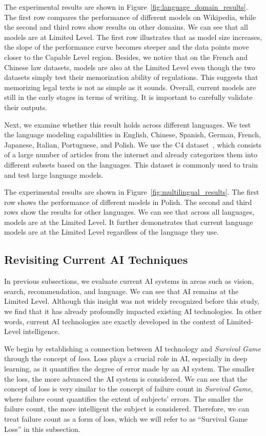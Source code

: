 The experimental results are shown in Figure~\ref{fig:language_domain_results}. The first row compares the performance of different models on Wikipedia, while the second and third rows show results on other domains. We can see that all models are at Limited Level. The first row illustrates that as model size increases, the slope of the performance curve becomes steeper and the data points move closer to the Capable Level region. Besides, we notice that on the French and Chinese law datasets, models are also at the Limited Level even though the two datasets simply test their memorization ability of regulations. This suggests that memorizing legal texts is not as simple as it sounds. Overall, current models are still in the early stages in terms of writing. It is important to carefully validate their outputs.



Next, we examine whether this result holds across different languages. We test the language modeling capabilities in English, Chinese, Spanish, German, French, Japanese, Italian, Portuguese, and Polish. We use the C4 dataset~\citep{raffel2020exploring}, which consists of a large number of articles from the internet and already categorizes them into different subsets based on the languages. This dataset is commonly used to train and test large language models. 


The experimental results are shown in Figure~\ref{fig:multilingual_results}. The first row shows the performance of different models in Polish. The second and third rows show the results for other languages. We can see that across all languages, models are at the Limited Level. It further demonstrates that current language models are at the Limited Level regardless of the language they use.


\subsection{Revisiting Current AI Techniques}

In previous subsections, we evaluate current AI systems in areas such as vision, search, recommendation, and language. We can see that AI remains at the Limited Level. Although this insight was not widely recognized before this study, we find that it has already profoundly impacted existing AI technologies. In other words, current AI technologies are exactly developed in the context of Limited-Level intelligence.

We begin by establishing a connection between AI technology and \textit{Survival Game} through the concept of \textit{loss}. Loss plays a crucial role in AI, especially in deep learning, as it quantifies the degree of error made by an AI system. The smaller the loss, the more advanced the AI system is considered. 
We can see that the concept of loss is very similar to the concept of failure count in \textit{Survival Game}, where failure count quantifies the extent of subjects' errors. The smaller the failure count, the more intelligent the subject is considered. Therefore, we can treat failure count as a form of loss, which we will refer to as ``Survival Game Loss'' in this subsection. 


